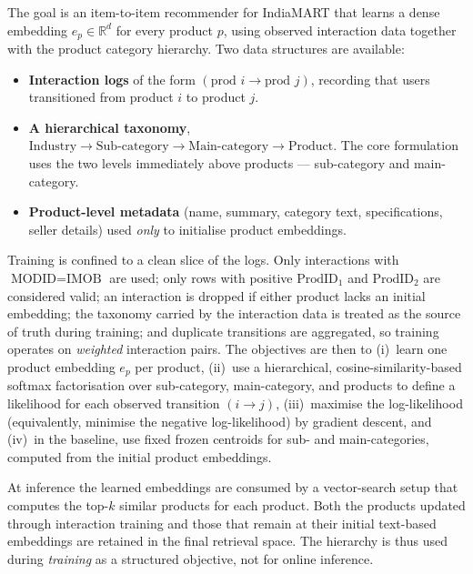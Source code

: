 The goal is an item-to-item recommender for IndiaMART that learns a dense
embedding $e_p \in \mathbb{R}^{d}$ for every product $p$, using observed
interaction data together with the product category hierarchy. Two data
structures are available:

\begin{itemize}
  \item \textbf{Interaction logs} of the form $(\text{prod } i \to
        \text{prod } j)$, recording that users transitioned from product $i$ to
        product $j$.
  \item \textbf{A hierarchical taxonomy},
        $\text{Industry} \to \text{Sub-category} \to \text{Main-category} \to
        \text{Product}$. The core formulation uses the two levels immediately
        above products --- sub-category and main-category.
  \item \textbf{Product-level metadata} (name, summary, category text,
        specifications, seller details) used \emph{only} to initialise product
        embeddings.
\end{itemize}

Training is confined to a clean slice of the logs. Only interactions with
$\text{MODID}=\text{IMOB}$ are used; only rows with positive $\text{ProdID}_1$
and $\text{ProdID}_2$ are considered valid; an interaction is dropped if either
product lacks an initial embedding; the taxonomy carried by the interaction
data is treated as the source of truth during training; and duplicate
transitions are aggregated, so training operates on \emph{weighted} interaction
pairs. The objectives are then to (i)~learn one product embedding $e_p$ per
product, (ii)~use a hierarchical, cosine-similarity-based softmax factorisation
over sub-category, main-category, and products to define a likelihood for each
observed transition $(i\to j)$, (iii)~maximise the log-likelihood
(equivalently, minimise the negative log-likelihood) by gradient descent, and
(iv)~in the baseline, use fixed frozen centroids for sub- and main-categories,
computed from the initial product embeddings.

At inference the learned embeddings are consumed by a vector-search setup that
computes the top-$k$ similar products for each product. Both the products
updated through interaction training and those that remain at their initial
text-based embeddings are retained in the final retrieval space. The hierarchy
is thus used during \emph{training} as a structured objective, not for online
inference.

